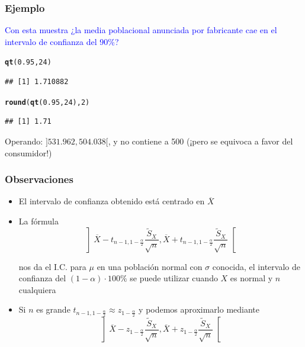\documentclass[12pt,t]{beamer}\usepackage[]{graphicx}\usepackage[]{color}
\makeatletter
\newcommand{\hlnum}[1]{\textcolor[rgb]{0.686,0.059,0.569}{#1}}%
\newcommand{\hlstd}[1]{\textcolor[rgb]{0.345,0.345,0.345}{#1}}%
\newcommand{\hlkwd}[1]{\textcolor[rgb]{0.737,0.353,0.396}{\textbf{#1}}}%
\newenvironment{kframe}{%
 \def\at@end@of@kframe{}%
 \ifinner\ifhmode%
  \def\at@end@of@kframe{\end{minipage}}%
  \begin{minipage}{\columnwidth}%
 \fi\fi%
 \def\FrameCommand##1{\hskip\@totalleftmargin \hskip-\fboxsep
 \colorbox{shadecolor}{##1}\hskip-\fboxsep
     \hskip-\linewidth \hskip-\@totalleftmargin \hskip\columnwidth}%
 \MakeFramed {\advance\hsize-\width
   \@totalleftmargin\z@ \linewidth\hsize
   \@setminipage}}%
 {\par\unskip\endMakeFramed%
 \at@end@of@kframe}
\newenvironment{knitrout}{}{} %
\newcommand{\blue}[1]{\textcolor{blue}{#1}}
\renewcommand{\emph}[1]{{\color{red}#1}}
\theoremstyle{plain}
\theoremstyle{definition}
\makeatother
\begin{document}
\begin{frame}[fragile]
\frametitle{Ejemplo}

\blue{Con esta muestra ¿la media   poblacional anunciada por fabricante cae en el  intervalo de confianza  del 90\%?}

\begin{knitrout}\small
{}\color{fgcolor}\begin{kframe}
\begin{alltt}
\hlkwd{qt}\hlstd{(}\hlnum{0.95}\hlstd{,}\hlnum{24}\hlstd{)}
\end{alltt}
\begin{verbatim}
## [1] 1.710882
\end{verbatim}
\begin{alltt}
\hlkwd{round}\hlstd{(}\hlkwd{qt}\hlstd{(}\hlnum{0.95}\hlstd{,}\hlnum{24}\hlstd{),}\hlnum{2}\hlstd{)}
\end{alltt}
\begin{verbatim}
## [1] 1.71
\end{verbatim}
\end{kframe}
\end{knitrout}


Operando: $]531.962,504.038[$, y no contiene a 500 (¡pero se equivoca a favor del consumidor!)
\end{frame}



\begin{frame}
\frametitle{Observaciones }

\begin{itemize}
\item El intervalo de confianza  obtenido  está centrado   en $\overline{X}$
\medskip

\item La fórmula
$$
\left] 
\overline{X}-t_{n-1,1-\frac{\alpha}{2}} \frac{\widetilde{S}_{X}}{\sqrt{n}},
\overline{X}+t_{n-1,1-\frac{\alpha}{2}}\frac{\widetilde{S}_{X}}{\sqrt{n}} \right[
$$

nos da el I.C. para $\mu$ en una población normal con $\sigma$ conocida, el   intervalo de confianza  del $(1-\alpha)\cdot 100\%$ se  puede utilizar  cuando $X$ es normal y $n$ cualquiera
\bigskip

\item Si $n$ es grande $t_{n-1,1-\frac{\alpha}{2}}\approx z_{1-\frac{\alpha}{2}}$ y podemos \emph{aproximarlo}  mediante
$$
\left] 
\overline{X}-z_{1-\frac{\alpha}{2}} \frac{\widetilde{S}_{X}}{\sqrt{n}},
\overline{X}+z_{1-\frac{\alpha}{2}}\frac{\widetilde{S}_{X}}{\sqrt{n}} \right[
$$
\end{itemize}


\end{frame}
\end{document}
